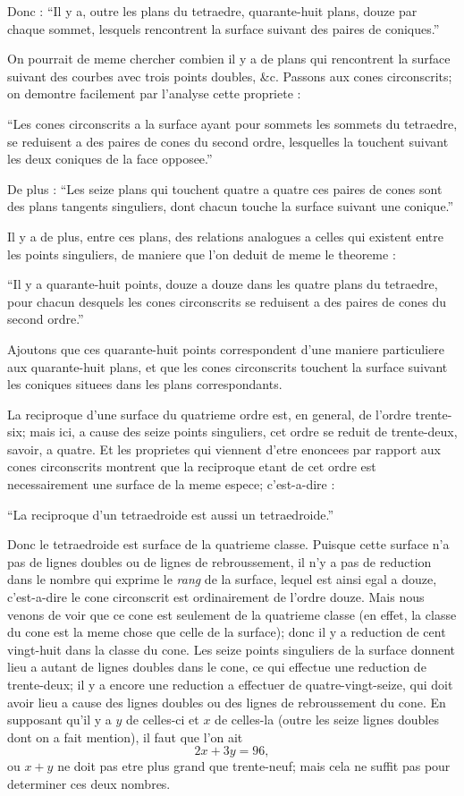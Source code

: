 \documentclass[12pt,a4paper]{article}
\theoremstyle{plain}
\begin{document}
Donc : ``Il y a, outre les plans du tetraedre, quarante-huit plans, douze par chaque sommet, lesquels rencontrent la surface suivant des paires de coniques.''

On pourrait de meme chercher combien il y a de plans qui rencontrent la surface suivant des courbes avec trois points doubles, \&c. Passons aux cones circonscrits; on demontre facilement par l'analyse cette propriete :

``Les cones circonscrits a la surface ayant pour sommets les sommets du tetraedre, se reduisent a des paires de cones du second ordre, lesquelles la touchent suivant les deux coniques de la face opposee.''

De plus : ``Les seize plans qui touchent quatre a quatre ces paires de cones sont des plans tangents singuliers, dont chacun touche la surface suivant une conique.''

Il y a de plus, entre ces plans, des relations analogues a celles qui existent entre les points singuliers, de maniere que l'on deduit de meme le theoreme :

``Il y a quarante-huit points, douze a douze dans les quatre plans du tetraedre, pour chacun desquels les cones circonscrits se reduisent a des paires de cones du second ordre.''

Ajoutons que ces quarante-huit points correspondent d'une maniere particuliere aux quarante-huit plans, et que les cones circonscrits touchent la surface suivant les coniques situees dans les plans correspondants.

La reciproque d'une surface du quatrieme ordre est, en general, de l'ordre trente-six; mais ici, a cause des seize points singuliers, cet ordre se reduit de trente-deux, savoir, a quatre. Et les proprietes qui viennent d'etre enoncees par rapport aux cones circonscrits montrent que la reciproque etant de cet ordre est necessairement une surface de la meme espece; c'est-a-dire :

``La reciproque d'un tetraedroide est aussi un tetraedroide.''

Donc le tetraedroide est surface de la quatrieme classe. Puisque cette surface n'a pas de lignes doubles ou de lignes de rebroussement, il n'y a pas de reduction dans le nombre qui exprime le \textit{rang} de la surface, lequel est ainsi egal a douze, c'est-a-dire le cone circonscrit est ordinairement de l'ordre douze. Mais nous venons de voir que ce cone est seulement de la quatrieme classe (en effet, la classe du cone est la meme chose que celle de la surface); donc il y a reduction de cent vingt-huit dans la classe du cone. Les seize points singuliers de la surface donnent lieu a autant de lignes doubles dans le cone, ce qui effectue une reduction de trente-deux; il y a encore une reduction a effectuer de quatre-vingt-seize, qui doit avoir lieu a cause des lignes doubles ou des lignes de rebroussement du cone. En supposant qu'il y a $y$ de celles-ci et $x$ de celles-la (outre les seize lignes doubles dont on a fait mention), il faut que l'on ait
\[
2x + 3y = 96,
\]
ou $x + y$ ne doit pas etre plus grand que trente-neuf; mais cela ne suffit pas pour determiner ces deux nombres.
\end{document}
